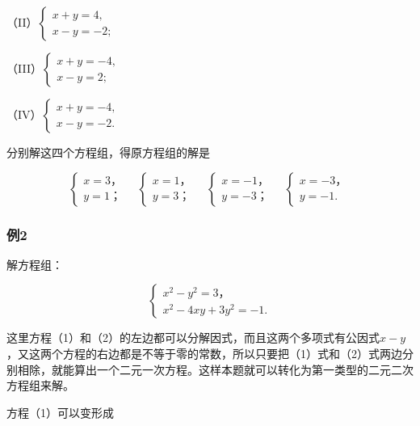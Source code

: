 （II）\(\left\{ \begin{array}{l} x + y = 4, \\ x - y = -2; \end{array} \right.\)

（III）\(\left\{ \begin{array}{l} x + y = -4, \\ x - y = 2; \end{array} \right.\)

（IV）\(\left\{ \begin{array}{l} x + y = -4, \\ x - y = -2. \end{array} \right.\)

分别解这四个方程组，得原方程组的解是

\[
\left\{ \begin{array}{l} x = 3\text{，} \\ y = 1\text{；} \end{array} \right. \quad \left\{ \begin{array}{l} x = 1\text{，} \\ y = 3\text{；} \end{array} \right. \quad \left\{ \begin{array}{l} x = - 1\text{，} \\ y = - 3\text{；} \end{array} \right. \quad \left\{ \begin{array}{l} x = - 3\text{，} \\ y = - 1. \end{array} \right.
\]

\subsubsection{例2}

解方程组：

\[
\left\{ \begin{array}{l} x ^ {2} - y ^ {2} = 3\text{，} \\ x ^ {2} - 4 x y + 3 y ^ {2} = - 1. \end{array} \right. \tag{1}
\]

这里方程（1）和（2）的左边都可以分解因式，而且这两个多项式有公因式\(x - y\)，又这两个方程的右边都是不等于零的常数，所以只要把（1）式和（2）式两边分别相除，就能算出一个二元一次方程。这样本题就可以转化为第一类型的二元二次方程组来解。

 方程（1）可以变形成

